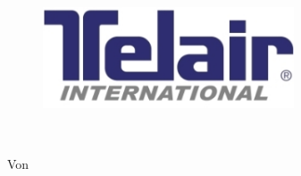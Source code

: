 \begin{titlepage}
\pagestyle{empty}

\begin{flushright}
\begin{figure}[ht]
\flushright
\includegraphics[height=3cm]{pictures/logo.jpg}
\end{figure}
\end{flushright}

\begin{center}
\vspace{1cm}
\begin{onehalfspace}
{\fontsize{22}{26} \selectfont \textbf{\docTitle}}\\[5mm]
{\fontsize{18}{22} \selectfont \docUntertitle}


\end{onehalfspace}
\end{center}

    \begin{center}
        Von \docVorname~\docNachname\\
 	    \docAbgabedatum
    \end{center}
\end{titlepage}

